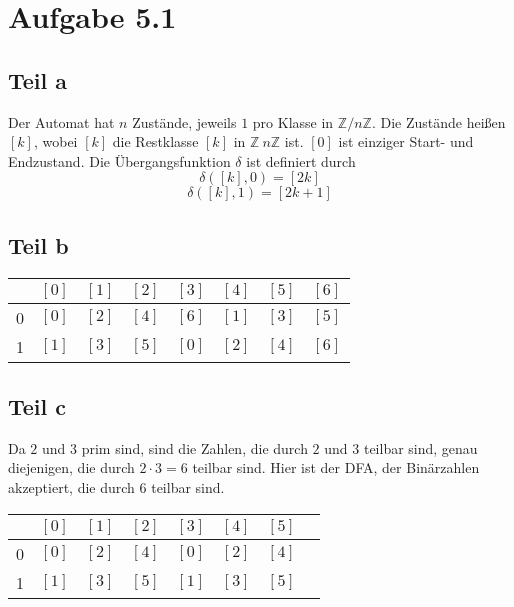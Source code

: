 \documentclass[10pt,a4paper]{article}
\begin{document}
\section{Aufgabe 5.1}

\subsection{Teil a}

Der Automat hat $n$ Zustände, jeweils $1$ pro Klasse in $\mathbb{Z} / n \mathbb{Z}$.
Die Zustände heißen $[k]$, wobei $[k]$ die Restklasse $[k]$ in $\mathbb{Z} \ n \mathbb{Z}$ ist.
$[0]$ ist einziger Start- und Endzustand.
Die Übergangsfunktion $\delta$ ist definiert durch
\begin{equation}
  \delta([k], 0) = [2k]
\end{equation}
\begin{equation}
  \delta([k], 1) = [2k + 1]
\end{equation}

\subsection{Teil b}

\begin{tabular}{c|c|c|c|c|c|c|c}
    & $[0]$ & $[1]$ & $[2]$ & $[3]$ & $[4]$ & $[5]$ & $[6]$\\\hline
  0 & $[0]$ & $[2]$ & $[4]$ & $[6]$ & $[1]$ & $[3]$ & $[5]$\\\hline
  1 & $[1]$ & $[3]$ & $[5]$ & $[0]$ & $[2]$ & $[4]$ & $[6]$\\
\end{tabular}

\subsection{Teil c}

Da $2$ und $3$ prim sind, sind die Zahlen, die durch $2$ und $3$ teilbar sind, genau diejenigen, die durch $2 \cdot 3 = 6$ teilbar sind.
Hier ist der DFA, der Binärzahlen akzeptiert, die durch $6$ teilbar sind.

\begin{tabular}{c|c|c|c|c|c|c|c}
    & $[0]$ & $[1]$ & $[2]$ & $[3]$ & $[4]$ & $[5]$\\\hline
  0 & $[0]$ & $[2]$ & $[4]$ & $[0]$ & $[2]$ & $[4]$\\\hline
  1 & $[1]$ & $[3]$ & $[5]$ & $[1]$ & $[3]$ & $[5]$\\
\end{tabular}
\end{document}
